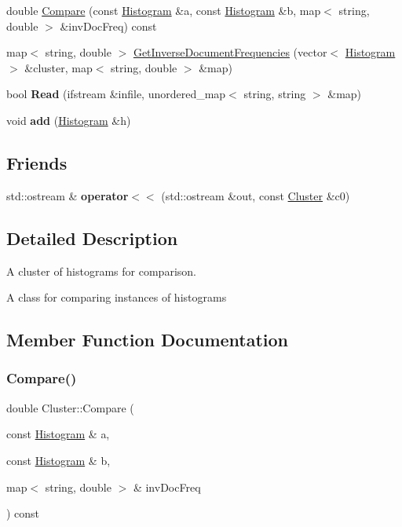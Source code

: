 \begin{DoxyCompactItemize}
\item 
double \hyperlink{classCluster_ad4f8765aefafc838c95a9c2334ee0356}{Compare} (const \hyperlink{classHistogram}{Histogram} \&a, const \hyperlink{classHistogram}{Histogram} \&b, map$<$ string, double $>$ \&inv\+Doc\+Freq) const
\item 
map$<$ string, double $>$ \hyperlink{classCluster_ada4f897af1294c97e3ff2f8023a92b55}{Get\+Inverse\+Document\+Frequencies} (vector$<$ \hyperlink{classHistogram}{Histogram} $>$ \&cluster, map$<$ string, double $>$ \&map)
\item 
\mbox{\label{classCluster_ad9132f66736e8f170eb7746f9cd482d0}} 
bool {\bfseries Read} (ifstream \&infile, unordered\+\_\+map$<$ string, string $>$ \&map)
\item 
\mbox{\label{classCluster_a410aab730d5fdf04b4ee8f230d0149e2}} 
void {\bfseries add} (\hyperlink{classHistogram}{Histogram} \&h)
\end{DoxyCompactItemize}
\subsection*{Friends}
\begin{DoxyCompactItemize}
\item 
\mbox{\label{classCluster_a80e9d0c8af3d3700176af496cc2dcf29}} 
std\+::ostream \& {\bfseries operator$<$$<$} (std\+::ostream \&out, const \hyperlink{classCluster}{Cluster} \&c0)
\end{DoxyCompactItemize}


\subsection{Detailed Description}
A cluster of histograms for comparison. 

A class for comparing instances of histograms 

\subsection{Member Function Documentation}
\mbox{\label{classCluster_ad4f8765aefafc838c95a9c2334ee0356}} 
\subsubsection{\texorpdfstring{Compare()}{Compare()}}
{\footnotesize\ttfamily double Cluster\+::\+Compare (\begin{DoxyParamCaption}\item[{const \hyperlink{classHistogram}{Histogram} \&}]{a,  }\item[{const \hyperlink{classHistogram}{Histogram} \&}]{b,  }\item[{map$<$ string, double $>$ \&}]{inv\+Doc\+Freq }\end{DoxyParamCaption}) const}

